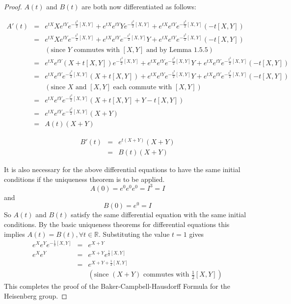 \documentclass[honours]{UNSWthesis}
\newcommand{\R}{\mathbb{R}}
\newcommand{\1}{\mathbf{e}_{1}}
\newcommand{\2}{\mathbf{e}_{3}}
\newcommand{\3}{\mathbf{e}_{3}}
\begin{document}
\begin{proof}
$A(t)$ and $B(t)$ are both now differentiated as follows:

\begin{eqnarray*}
A'(t) &=& e^{tX}Xe^{tY}e^{-\frac{t^2}{2}[X,Y]}+e^{tX}e^{tY}Ye^{-\frac{t^2}{2}[X,Y]}+e^{tX}e^{tY}e^{-\frac{t^2}{2}[X,Y]}(-t[X,Y]) \\
&=& e^{tX}Xe^{tY}e^{-\frac{t^2}{2}[X,Y]}+e^{tX}e^{tY}e^{-\frac{t^2}{2}[X,Y]}Y+e^{tX}e^{tY}e^{-\frac{t^2}{2}[X,Y]}(-t[X,Y]) \\
& & (\text{since $Y$ commutes with $[X,Y]$ and by Lemma 1.5.5})\\
&=&e^{tX}e^{tY}(X+t[X,Y])e^{-\frac{t^2}{2}[X,Y]}+e^{tX}e^{tY}e^{-\frac{t^2}{2}[X,Y]}Y+e^{tX}e^{tY}e^{-\frac{t^2}{2}[X,Y]}(-t[X,Y]) \\
&=& e^{tX}e^{tY}e^{-\frac{t^2}{2}[X,Y]}(X+t[X,Y])+e^{tX}e^{tY}e^{-\frac{t^2}{2}[X,Y]}Y+e^{tX}e^{tY}e^{-\frac{t^2}{2}[X,Y]}(-t[X,Y]) \\
& & (\text{since $X$ and $[X,Y]$ each commute with $[X,Y]$})\\
&=& e^{tX}e^{tY}e^{-\frac{t^2}{2}[X,Y]}(X+t[X,Y]+Y-t[X,Y]) \\
&=& e^{tX}e^{tY}e^{-\frac{t^2}{2}[X,Y]}(X+Y) \\
&=& A(t)(X+Y)
\end{eqnarray*}

\begin{eqnarray*}
B'(t) &=& e^{t(X+Y)}(X+Y) \\
&=& B(t)(X+Y)
\end{eqnarray*}

It is also necessary for the above differential equations to have the same initial conditions if the uniqueness theorem is to be applied. 
\[
A(0)=e^{0}e^{0}e^{0}=I^{3}=I
\]
and 
\[
B(0)=e^{0}=I
\]
So $A(t)$ and $B(t)$ satisfy the same differential equation with the same initial conditions. By the basic uniqueness theorems for differential equations this implies $A(t)=B(t), \forall t \in \R$. Substituting the value $t=1$ gives 
\begin{eqnarray*}
e^{X}e^{Y}e^{-\frac{1}{2}[X,Y]} &=&e^{X+Y} \\
e^{X}e^{Y} &=& e^{X+Y}e^{\frac{1}{2}[X,Y]} \\
&=& e^{X+Y+\frac{1}{2}[X,Y]} \\
& & (\text{since $(X+Y)$ commutes with $\frac{1}{2}[X,Y]$})
\end{eqnarray*}
This completes the proof of the Baker-Campbell-Hausdorff Formula for the Heisenberg group. 
\end{proof}
\end{document}
